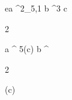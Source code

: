 \begin{eqcode}{e}{a }{^2_{5,1}}{}
  b \in {}^3 \lend
  c \gets
  \begin{tmatrix}
  2  \lend
  \end{tmatrix} \lend
  a \gets \genar \limits ^ {5}(c) \lend %
  b \gets \genar \limits ^ {  \begin{tmatrix}
  2  \lend
  \end{tmatrix} }(c) \lend 
\end{eqcode}

